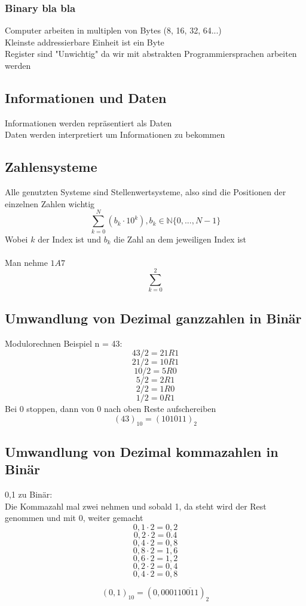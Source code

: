 \documentclass[11pt, a4paper]{article}
\begin{document}
\subsubsection{Binary bla bla}
Computer arbeiten in multiplen von Bytes (8, 16, 32, 64...)\\Kleinste addressierbare Einheit ist ein Byte\\Register sind "Unwichtig" da wir mit abstrakten Programmiersprachen arbeiten werden
\subsection{Informationen und Daten}
Informationen werden repräsentiert als Daten\\Daten werden interpretiert um Informationen zu bekommen
\subsection{Zahlensysteme}
Alle genutzten Systeme sind Stellenwertsysteme, also sind die Positionen der einzelnen Zahlen wichtig\\
\[
	\sum_{k=0}^{N}(b_{k} \cdot 10^{k}), b_{k} \in \mathbb{N} \{0,..., N-1\}
\]
Wobei $k$ der Index ist und $b_{k}$ die Zahl an dem jeweiligen Index ist\\\\Man nehme $1A7$\\
\[
	\sum_{k=0}^{2}
\]

\subsection{Umwandlung von Dezimal ganzzahlen in Binär}
Modulorechnen
Beispiel n = 43:\\
\[43/2 = 21 R1\]
\[21/2 = 10 R1\]
\[10/2 = 5 R0\]
\[5/2 = 2 R1\]
\[2/2 = 1 R0\]
\[1/2 = 0 R1\]
Bei 0 stoppen, dann von 0 nach oben Reste aufschereiben
\[(43)_{10} = (101011)_{2}\]

\subsection{Umwandlung von Dezimal kommazahlen in Binär}
0,1 zu Binär:\\
Die Kommazahl mal zwei nehmen und sobald 1, da steht wird der Rest genommen und mit 0, weiter gemacht
\[0,1 \cdot 2 = 0,2\]
\[0,2 \cdot 2 = 0.4\]
\[0,4 \cdot 2 = 0,8\]
\[0,8 \cdot 2 = 1,6\]
\[0,6 \cdot 2 = 1,2\]
\[0,2 \cdot 2 = 0,4\]
\[0,4 \cdot 2 = 0,8\]

\[(0,1)_{10} = (0,00011\overline{0011})_{2}\]
\end{document}
